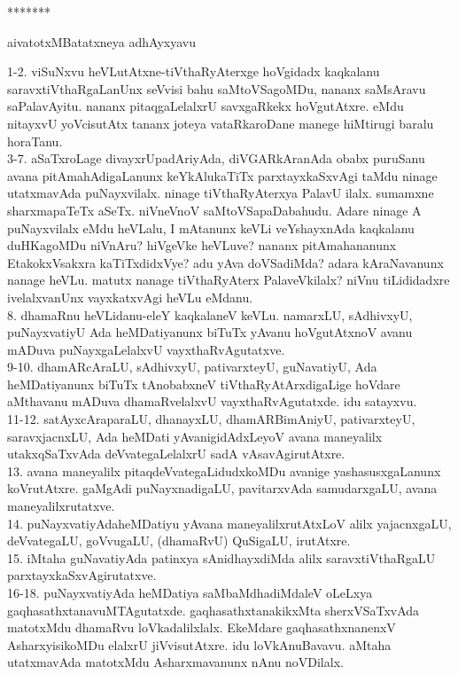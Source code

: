 \documentclass{article}
\begin{document}
\begin{center}
*******
\end{center}

\begin{center}
aivatotxMBatatxneya adhAyxyavu
\end{center}

1-2. viSuNxvu heVLutAtxne-tiVthaRyAterxge hoVgidadx kaqkalanu saravxtiVthaRgaLanUnx seVvisi bahu saMtoVSagoMDu, nananx saMsAravu saPalavAyitu. nananx pitaqgaLelalxrU savxgaRkekx hoVgutAtxre. eMdu nitayxvU yoVcisutAtx tananx joteya vataRkaroDane manege hiMtirugi baralu horaTanu.\\
3-7. aSaTxroLage divayxrUpadAriyAda, diVGARkAranAda obabx puruSanu avana pitAmahAdigaLanunx keYkAlukaTiTx parxtayxkaSxvAgi taMdu ninage utatxmavAda puNayxvilalx. ninage tiVthaRyAterxya PalavU ilalx. sumamxne sharxmapaTeTx aSeTx. niVneVnoV saMtoVSapaDabahudu. Adare ninage A puNayxvilalx eMdu heVLalu, I mAtanunx keVLi veYshayxnAda kaqkalanu duHKagoMDu niVnAru? hiVgeVke heVLuve? nananx pitAmahananunx EtakokxVsakxra kaTiTxdidxVye? adu yAva doVSadiMda? adara kAraNavanunx nanage heVLu. matutx nanage tiVthaRyAterx PalaveVkilalx? niVnu tiLididadxre ivelalxvanUnx vayxkatxvAgi heVLu eMdanu.\\
8. dhamaRnu heVLidanu-eleY kaqkalaneV keVLu. namarxLU, sAdhivxyU, puNayxvatiyU Ada heMDatiyanunx biTuTx yAvanu hoVgutAtxnoV avanu mADuva puNayxgaLelalxvU vayxthaRvAgutatxve.\\
9-10. dhamARcAraLU, sAdhivxyU, pativarxteyU, guNavatiyU, Ada heMDatiyanunx biTuTx tAnobabxneV tiVthaRyAtArxdigaLige hoVdare aMthavanu mADuva dhamaRvelalxvU vayxthaRvAgutatxde. idu satayxvu.\\
11-12. satAyxcAraparaLU, dhanayxLU, dhamARBimAniyU, pativarxteyU, saravxjacnxLU, Ada heMDati yAvanigidAdxLeyoV avana maneyalilx utakxqSaTxvAda deVvategaLelalxrU sadA vAsavAgirutAtxre.\\
13. avana maneyalilx pitaqdeVvategaLidudxkoMDu avanige yashasusxgaLanunx koVrutAtxre. gaMgAdi puNayxnadigaLU, pavitarxvAda samudarxgaLU, avana maneyalilxrutatxve.\\
14. puNayxvatiyAdaheMDatiyu yAvana maneyalilxrutAtxLoV alilx yajacnxgaLU, deVvategaLU, goVvugaLU, (dhamaRvU) QuSigaLU, irutAtxre.\\
15. iMtaha guNavatiyAda patinxya sAnidhayxdiMda alilx saravxtiVthaRgaLU parxtayxkaSxvAgirutatxve.\\
16-18. puNayxvatiyAda heMDatiya saMbaMdhadiMdaleV oLeLxya gaqhasathxtanavuMTAgutatxde. gaqhasathxtanakikxMta sherxVSaTxvAda matotxMdu dhamaRvu loVkadalilxlalx. EkeMdare gaqhasathxnanenxV AsharxyisikoMDu elalxrU jiVvisutAtxre. idu loVkAnuBavavu. aMtaha utatxmavAda matotxMdu Asharxmavanunx nAnu noVDilalx.\\
\end{document}
